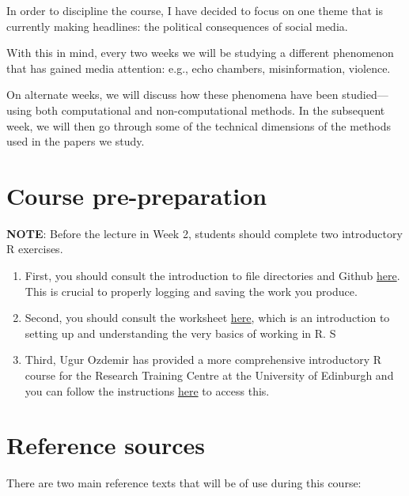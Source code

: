\documentclass[
  letterpaper,
  DIV=11,
  numbers=noendperiod]{scrreprt}
\begin{document}
In order to discipline the course, I have decided to focus on one theme
that is currently making headlines: the political consequences of social
media.

With this in mind, every two weeks we will be studying a different
phenomenon that has gained media attention: e.g., echo chambers,
misinformation, violence.

On alternate weeks, we will discuss how these phenomena have been
studied---using both computational and non-computational methods. In the
subsequent week, we will then go through some of the technical
dimensions of the methods used in the papers we study.

\hypertarget{course-pre-preparation}{%
\section*{Course pre-preparation}\label{course-pre-preparation}}

\textbf{NOTE}: Before the lecture in Week 2, students should complete
two introductory R exercises.

\begin{enumerate}
\def\labelenumi{\arabic{enumi}.}
\item
  First, you should consult the introduction to file directories and
  Github \href{https://cjbarrie.github.io/CS-ED/intro.html}{here}. This
  is crucial to properly logging and saving the work you produce.
\item
  Second, you should consult the worksheet
  \href{https://cjbarrie.github.io/CS-ED/intro.html}{here}, which is an
  introduction to setting up and understanding the very basics of
  working in R. S
\item
  Third, Ugur Ozdemir has provided a more comprehensive introductory R
  course for the Research Training Centre at the University of Edinburgh
  and you can follow the instructions
  \href{https://research-training-centre.sps.ed.ac.uk/micro-methods/}{here}
  to access this.
\end{enumerate}

\hypertarget{reference-sources}{%
\section*{Reference sources}\label{reference-sources}}

There are two main reference texts that will be of use during this
course:
\end{document}
